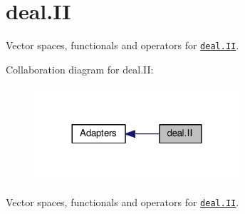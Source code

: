\hypertarget{group__dealIIGroup}{\section{deal.\-I\-I}
\label{group__dealIIGroup}
}


Vector spaces, functionals and operators for \href{http://www.dealii.org}{\tt deal.\-I\-I}.  


Collaboration diagram for deal.\-I\-I\-:
\nopagebreak
\begin{figure}[H]
\begin{center}
\leavevmode
\includegraphics[width=216pt]{group__dealIIGroup}
\end{center}
\end{figure}
Vector spaces, functionals and operators for \href{http://www.dealii.org}{\tt deal.\-I\-I}. 